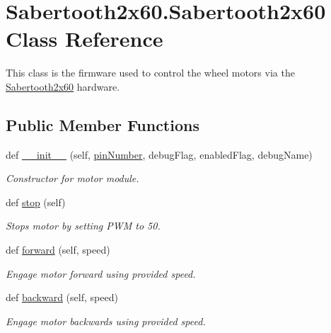 \hypertarget{classSabertooth2x60_1_1Sabertooth2x60}{}\section{Sabertooth2x60.\+Sabertooth2x60 Class Reference}
\label{classSabertooth2x60_1_1Sabertooth2x60}


This class is the firmware used to control the wheel motors via the \hyperlink{classSabertooth2x60_1_1Sabertooth2x60}{Sabertooth2x60} hardware.  


\subsection*{Public Member Functions}
\begin{DoxyCompactItemize}
\item 
def \hyperlink{classSabertooth2x60_1_1Sabertooth2x60_aba7178a08652239a3a9e5e84208402cd}{\+\_\+\+\_\+init\+\_\+\+\_\+} (self, \hyperlink{classSabertooth2x60_1_1Sabertooth2x60_a4813f129bd6fceeeb3a9b7bf9469f712}{pin\+Number}, debug\+Flag, enabled\+Flag, debug\+Name)
\begin{DoxyCompactList}\small\item\em Constructor for motor module. \end{DoxyCompactList}\item 
\mbox{\label{classSabertooth2x60_1_1Sabertooth2x60_ac3dbaedfe789dd1a594e8ad6a967e9a4}} 
def \hyperlink{classSabertooth2x60_1_1Sabertooth2x60_ac3dbaedfe789dd1a594e8ad6a967e9a4}{stop} (self)
\begin{DoxyCompactList}\small\item\em Stops motor by setting P\+WM to 50. \end{DoxyCompactList}\item 
def \hyperlink{classSabertooth2x60_1_1Sabertooth2x60_a94bd39afb0af0c75f71b1f0704e8abf2}{forward} (self, speed)
\begin{DoxyCompactList}\small\item\em Engage motor forward using provided speed. \end{DoxyCompactList}\item 
def \hyperlink{classSabertooth2x60_1_1Sabertooth2x60_a5a2e2924de1fc5a8db15997125f8e278}{backward} (self, speed)
\begin{DoxyCompactList}\small\item\em Engage motor backwards using provided speed. \end{DoxyCompactList}\end{DoxyCompactItemize}
